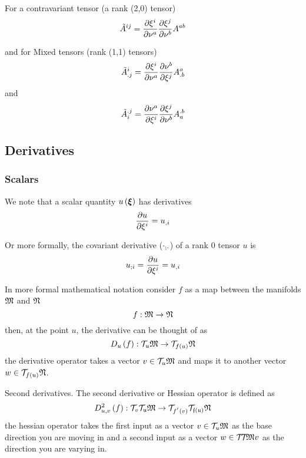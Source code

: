 For a contravariant tensor (a rank (2,0) tensor)
\begin{equation}
  {\tilde{A}}^{ij}=\delby{\xi^{i}}{\nu^{a}}\delby{\xi^{j}}{\nu^{b}}A^{ab}
\end{equation}

and for Mixed tensors (rank (1,1) tensors)
\begin{equation}
  {\tilde{A}}^{i}_{.j}=\delby{\xi^{i}}{\nu^{a}}\delby{\nu^{b}}{\xi^{j}}A^{a}_{.b}
\end{equation}
and
\begin{equation}
  {\tilde{A}}_{i}^{.j}=\delby{\nu^{a}}{\xi^{i}}\delby{\xi^{j}}{\nu^{b}}A_{a}^{.b}
\end{equation}

\subsection{Derivatives}
\label{subsec:function derivatives}

\subsubsection{Scalars}

We note that a scalar quantity $\fnof{u}{\vectr{\xi}}$ has derivatives
\begin{equation}
  \delby{u}{\xi^{i}}=\partialderiv{u}{i}
\end{equation}

Or more formally, the covariant derivative ($\covarderiv{\cdot}{\cdot}$) of a
rank 0 tensor $u$ is
\begin{equation}
  \covarderiv{u}{i}=\delby{u}{\xi^{i}}=\partialderiv{u}{i}
\end{equation}

In more formal mathematical notation consider $f$ as a map between the
manifolds $\manifold{M}$ and $\manifold{N}$ \ie
\begin{equation}
  \mapping{f}{\manifold{M}}{\manifold{N}}
\end{equation}
then, at the point $u$, the derivative can be thought of as 
\begin{equation}
  \mapping{\derivativeop{u}{f}}{\tangentspace{M}{u}}{\tangentspace{N}{\fnof{f}{u}}}
\end{equation}
\ie the derivative operator takes a vector $v\in\tangentspace{M}{u}$ and maps
it to another vector $w\in\tangentspace{N}{\fnof{f}{u}}$.

Second derivatives. The second derivative or Hessian operator is defined as
\begin{equation}
  \mapping{\hessianop{u,v}{f}}{\tangentspace{\tangentspace{M}{u}}{v}}{\tangentspace{\tangentspace{N}{\fnof{f}{u}}}{\fnof{f^{'}}{v}}}
\end{equation}
\ie the hessian operator takes the first input as a vector
$v\in\tangentspace{M}{u}$ as the base direction you are moving in and a
second input as a vector $w\in\tangentspace{\tangentspace{M}}{}{v}$ as the direction
you are varying in.

